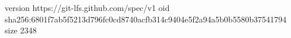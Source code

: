 version https://git-lfs.github.com/spec/v1
oid sha256:6801f7ab5f5213d796fc0cd8740acfb314c9404e5f2a94a5b0b5580b37541794
size 2348
